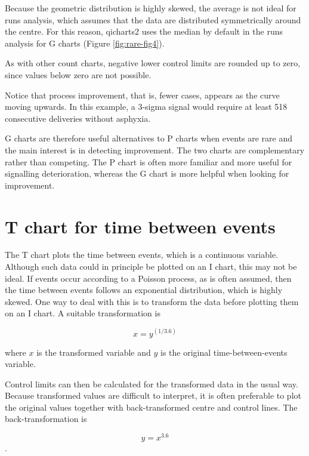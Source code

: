 \documentclass[
]{book}
\newenvironment{Shaded}{\begin{snugshade}}{\end{snugshade}}
\newcommand{\AttributeTok}[1]{\textcolor[rgb]{0.13,0.29,0.53}{#1}}
\newcommand{\CommentTok}[1]{\textcolor[rgb]{0.56,0.35,0.01}{\textit{#1}}}
\newcommand{\FunctionTok}[1]{\textcolor[rgb]{0.13,0.29,0.53}{\textbf{#1}}}
\newcommand{\NormalTok}[1]{#1}
\newcommand{\OtherTok}[1]{\textcolor[rgb]{0.56,0.35,0.01}{#1}}
\newcommand{\SpecialCharTok}[1]{\textcolor[rgb]{0.81,0.36,0.00}{\textbf{#1}}}
\newcommand{\StringTok}[1]{\textcolor[rgb]{0.31,0.60,0.02}{#1}}
\begin{document}
Because the geometric distribution is highly skewed, the average is not ideal for runs analysis, which assumes that the data are distributed symmetrically around the centre. For this reason, qicharts2 uses the median by default in the runs analysis for G charts (Figure \ref{fig:rare-fig4}).

As with other count charts, negative lower control limits are rounded up to zero, since values below zero are not possible.

Notice that process improvement, that is, fewer cases, appears as the curve moving upwards. In this example, a 3-sigma signal would require at least 518 consecutive deliveries without asphyxia.

G charts are therefore useful alternatives to P charts when events are rare and the main interest is in detecting improvement. The two charts are complementary rather than competing. The P chart is often more familiar and more useful for signalling deterioration, whereas the G chart is more helpful when looking for improvement.

\section{T chart for time between events}\label{t-chart-for-time-between-events}

The T chart plots the time between events, which is a continuous variable. Although such data could in principle be plotted on an I chart, this may not be ideal. If events occur according to a Poisson process, as is often assumed, then the time between events follows an exponential distribution, which is highly skewed.
One way to deal with this is to transform the data before plotting them on an I chart. A suitable transformation is

\[x = y^{(1 / 3.6)}\]

where \(x\) is the transformed variable and \(y\) is the original time-between-events variable.

Control limits can then be calculated for the transformed data in the usual way. Because transformed values are difficult to interpret, it is often preferable to plot the original values together with back-transformed centre and control lines. The back-transformation is

\[y=x^{3.6}\].

\begin{Shaded}
\end{Shaded}
\end{document}
